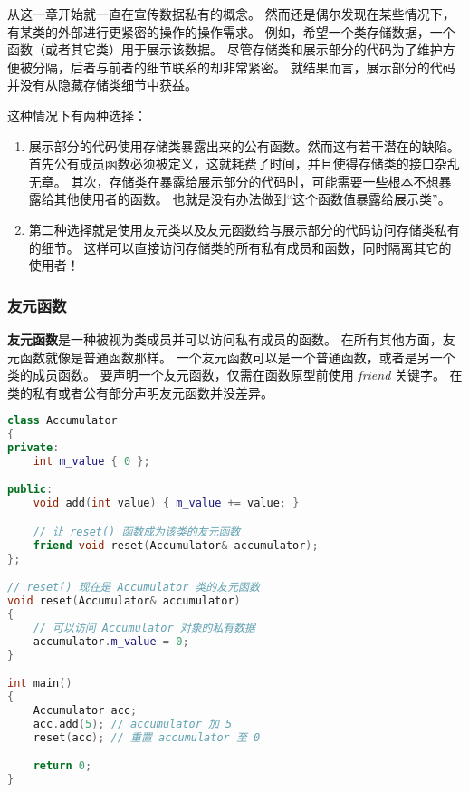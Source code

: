 \documentclass[../../LearnCpp.tex]{subfiles}
\begin{document}

从这一章开始就一直在宣传数据私有的概念。
然而还是偶尔发现在某些情况下，有某类的外部进行更紧密的操作的操作需求。
例如，希望一个类存储数据，一个函数（或者其它类）用于展示该数据。
尽管存储类和展示部分的代码为了维护方便被分隔，后者与前者的细节联系的却非常紧密。
就结果而言，展示部分的代码并没有从隐藏存储类细节中获益。

这种情况下有两种选择：

\begin{enumerate}
  \item 展示部分的代码使用存储类暴露出来的公有函数。然而这有若干潜在的缺陷。
        首先公有成员函数必须被定义，这就耗费了时间，并且使得存储类的接口杂乱无章。
        其次，存储类在暴露给展示部分的代码时，可能需要一些根本不想暴露给其他使用者的函数。
        也就是没有办法做到“这个函数值暴露给展示类”。
  \item 第二种选择就是使用友元类以及友元函数给与展示部分的代码访问存储类私有的细节。
        这样可以直接访问存储类的所有私有成员和函数，同时隔离其它的使用者！
\end{enumerate}

\subsubsection*{友元函数}

\textbf{友元函数}是一种被视为类成员并可以访问私有成员的函数。
在所有其他方面，友元函数就像是普通函数那样。
一个友元函数可以是一个普通函数，或者是另一个类的成员函数。
要声明一个友元函数，仅需在函数原型前使用 \textit{friend} 关键字。
在类的私有或者公有部分声明友元函数并没差异。

\begin{lstlisting}[language=C++]
class Accumulator
{
private:
    int m_value { 0 };

public:
    void add(int value) { m_value += value; }

    // 让 reset() 函数成为该类的友元函数
    friend void reset(Accumulator& accumulator);
};

// reset() 现在是 Accumulator 类的友元函数
void reset(Accumulator& accumulator)
{
    // 可以访问 Accumulator 对象的私有数据
    accumulator.m_value = 0;
}

int main()
{
    Accumulator acc;
    acc.add(5); // accumulator 加 5
    reset(acc); // 重置 accumulator 至 0

    return 0;
}
\end{lstlisting}
\end{document}
